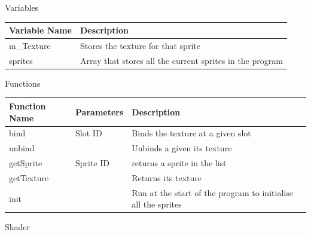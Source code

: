 \documentclass[../../Main.tex]{subfiles}
\begin{document}
    \begin{center}
        Variables
        \begin{tabular}{ | m{} | m{} | }
            \hline
            \textbf{Variable Name} & \textbf{Description} \\
            \hline
            m\_Texture & Stores the texture for that sprite \\
            \hline
            sprites & Array that stores all the current sprites in the program \\
            \hline
        \end{tabular}
        Functions
        \begin{tabular}{ | m{} | m{}| m{} | }
            \hline
            \textbf{Function Name} & \textbf{Parameters} & \textbf{Description} \\
            \hline
            bind & Slot ID & Binds the texture at a given slot \\
            \hline
            unbind & & Unbinds a given its texture \\
            \hline
            getSprite & Sprite ID & returns a sprite in the list \\
            \hline
            getTexture & & Returns its texture \\
            \hline
            init & & Run at the start of the program to initialise all the sprites \\
            \hline
        \end{tabular}
    \end{center}
    Shader
\end{document}
